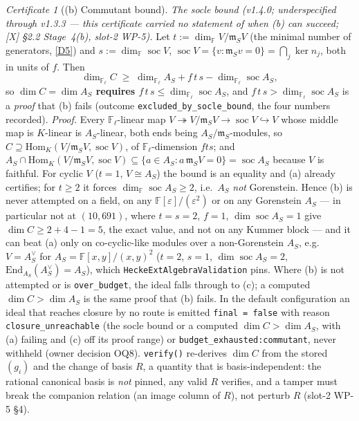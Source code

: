\documentclass[11pt]{article}
\theoremstyle{remark}
\newtheorem{certificate}[theorem]{Certificate}
\newcommand{\F}{\mathbb{F}}
\newcommand{\End}{\mathrm{End}}
\newcommand{\Hom}{\mathrm{Hom}}
\newcommand{\Fl}{\F_\ell}
\DeclareMathOperator{\soc}{soc}
\newcommand{\m}{\mathfrak{m}}
\begin{document}
\begin{certificate}[(b) Commutant bound]
\emph{The socle bound (v1.4.0; underspecified through v1.3.3 --- this certificate carried no
statement of \emph{when} (b) can succeed; [X] \S2.2 Stage~4(b), slot-2 WP-5).} Let
$t:=\dim_\F V/\m_SV$ (the minimal number of generators, \ref{D5}) and $s:=\dim_\F\soc V$,
$\soc V=\{v:\m_Sv=0\}=\bigcap_j\ker n_j$, both in units of $f$. Then
\[
\dim_{\Fl}C\;\ge\;\dim_{\Fl}A_S+f\,t\,s-\dim_{\Fl}\soc A_S ,
\]
so \textbf{$\dim C=\dim A_S$ requires $f\,t\,s\le\dim_{\Fl}\soc A_S$}, and
$f\,t\,s>\dim_{\Fl}\soc A_S$ is a \emph{proof} that (b) fails (outcome
\texttt{excluded\_by\_socle\_bound}, the four numbers recorded). \emph{Proof.} Every
$\Fl$-linear map $V\twoheadrightarrow V/\m_SV\to\soc V\hookrightarrow V$ whose middle map is
$K$-linear is $A_S$-linear, both ends being $A_S/\m_S$-modules, so
$C\supseteq\Hom_K(V/\m_SV,\soc V)$, of $\Fl$-dimension $fts$; and
$A_S\cap\Hom_K(V/\m_SV,\soc V)\subseteq\{a\in A_S:a\,\m_SV=0\}=\soc A_S$ because $V$ is faithful.
For cyclic $V$ ($t=1$, $V\cong A_S$) the bound is an equality and (a) already certifies; for
$t\ge2$ it forces $\dim_\F\soc A_S\ge2$, i.e.\ $A_S$ \emph{not} Gorenstein. Hence (b) is never
attempted on a field, on any $\F[\varepsilon]/(\varepsilon^2)$ or on any Gorenstein $A_S$ ---
in particular not at $(10,691)$, where $t=s=2$, $f=1$, $\dim\soc A_S=1$ give
$\dim C\ge2+4-1=5$, the exact value, and not on any Kummer block --- and it can beat (a) only on
co-cyclic-like modules over a non-Gorenstein $A_S$, e.g.\ $V=A_S^\vee$ for
$A_S=\F[x,y]/(x,y)^2$ ($t=2$, $s=1$, $\dim\soc A_S=2$, $\End_{A_S}(A_S^\vee)=A_S$), which
\texttt{HeckeExtAlgebraValidation} pins. Where (b) is not attempted or is \texttt{over\_budget},
the ideal falls through to (c); a computed $\dim C>\dim A_S$ is the same proof that (b) fails.
In the default configuration an ideal that reaches closure by no route is emitted
\texttt{final = false} with reason \texttt{closure\_unreachable} (the socle bound or a computed
$\dim C>\dim A_S$, with (a) failing and (c) off its proof range) or
\texttt{budget\_exhausted:commutant}, never withheld (owner decision OQ8). \texttt{verify()}
re-derives $\dim C$ from the stored $(g_i)$ and the change of basis $R$, a quantity that is
basis-independent: the rational canonical basis is \emph{not} pinned, any valid $R$ verifies,
and a tamper must break the companion relation (an image column of $R$), not perturb $R$
(slot-2 WP-5 \S4).
\end{certificate}
\end{document}

